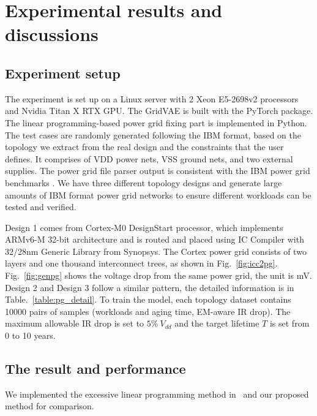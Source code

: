 \section{Experimental results and discussions}
\label{sec:results}
\subsection{Experiment setup}
The experiment is set up on a Linux server with 2 Xeon E5-2698v2 processors and Nvidia Titan X RTX GPU. 
The GridVAE is built with the PyTorch package. 
The linear programming-based power grid fixing part is implemented in Python.
The test cases are randomly generated following the IBM format, based on the topology we extract from the real design and the constraints that the user defines.
It comprises of VDD power nets, VSS ground nets, and two external supplies.
The power grid file parser output is consistent with the IBM power grid benchmarks \cite{Nassif:ASPDAC'08}.
We have three different topology designs and generate large amounts of IBM format power grid networks to ensure different workloads can be tested and verified. 

Design 1 comes from Cortex-M0 DesignStart processor, which implements ARMv6-M 32-bit architecture and is routed and placed using IC Compiler with 32/28nm Generic Library from Synopsys. 
The Cortex power grid consists of two layers and one thousand interconnect trees, as shown in Fig.~\ref{fig:icc2pg}. Fig.~\ref{fig:genpg} shows the voltage drop from the same power grid, the unit is mV.
Design 2 and Design 3 follow a similar pattern, the detailed information is in Table.~\ref{table:pg_detail}.
To train the model, each topology dataset contains 10000 pairs of samples  (workloads and aging time, EM-aware IR drop). The maximum allowable IR drop is set to $5\% \ V_{dd}$ and the target lifetime $\textit{T}$ is set from 0 to 10 years. 




\subsection{The result and performance}
We implemented the excessive linear programming method in~\cite{Sukharev:2019pg} and our proposed method for comparison. 

